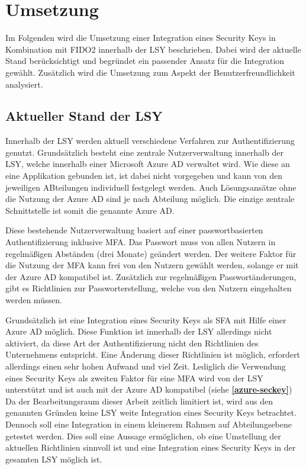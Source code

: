 
\chapter{Umsetzung}
Im Folgenden wird die Umsetzung einer Integration eines Security Keys in Kombination mit \ac{FIDO}2 innerhalb der \ac{LSY} beschrieben. Dabei wird der aktuelle Stand berücksichtigt und begründet ein passender Ansatz für die Integration gewählt. Zusätzlich wird die Umsetzung zum Aspekt der Benutzerfreundlichkeit analysiert.

\section{Aktueller Stand der LSY} \label{current}
Innerhalb der \ac{LSY} werden aktuell verschiedene Verfahren zur Authentifizierung genutzt. Grundsätzlich besteht eine zentrale Nutzerverwaltung innerhalb der \ac{LSY}, welche innerhalb einer Microsoft Azure \ac{AD} verwaltet wird. Wie diese an eine Applikation gebunden ist, ist dabei nicht vorgegeben und kann von den jeweiligen ABteilungen individuell festgelegt werden. Auch Lösungsansätze ohne die Nutzung der Azure \ac{AD} sind je nach Abteilung möglich. Die einzige zentrale Schnittstelle ist somit die genannte Azure \ac{AD}.

Diese bestehende Nutzerverwaltung basiert auf einer passwortbasierten Authentifizierung inklusive \ac{MFA}. Das Passwort muss von allen Nutzern in regelmäßigen Abständen (drei Monate) geändert werden. Der weitere Faktor für die Nutzung der \ac{MFA} kann frei von den Nutzern gewählt werden, solange er mit der Azure \ac{AD} kompatibel ist. Zusätzlich zur regelmäßigen Passwortänderungen, gibt es Richtlinien zur Passworterstellung, welche von den Nutzern eingehalten werden müssen. 

Grundsätzlich ist eine Integration eines Security Keys als \ac{SFA} mit Hilfe einer Azure \ac{AD} möglich. Diese Funktion ist innerhalb der \ac{LSY} allerdings nicht aktiviert, da diese Art der Authentifizierung nicht den Richtlinien des Unternehmens entspricht. Eine Änderung dieser Richtlinien ist möglich, erfordert allerdings einen sehr hohen Aufwand und viel Zeit. Lediglich die Verwendung eines Security Keys als zweiten Faktor für eine \ac{MFA} wird von der \ac{LSY} unterstützt und ist auch mit der Azure \ac{AD} kompatibel (siehe \textbf{\ref{azure-seckey}}) Da der Bearbeitungsraum dieser Arbeit zeitlich limitiert ist, wird aus den genannten Gründen keine \ac{LSY} weite Integration eines Security Keys betrachtet. Dennoch soll eine Integration in einem kleinerem Rahmen auf Abteilungsebene getestet werden. Dies soll eine Aussage ermöglichen, ob eine Umstellung der aktuellen Richtlinien sinnvoll ist und eine Integration eines Security Keys in der gesamten \ac{LSY} möglich ist.


